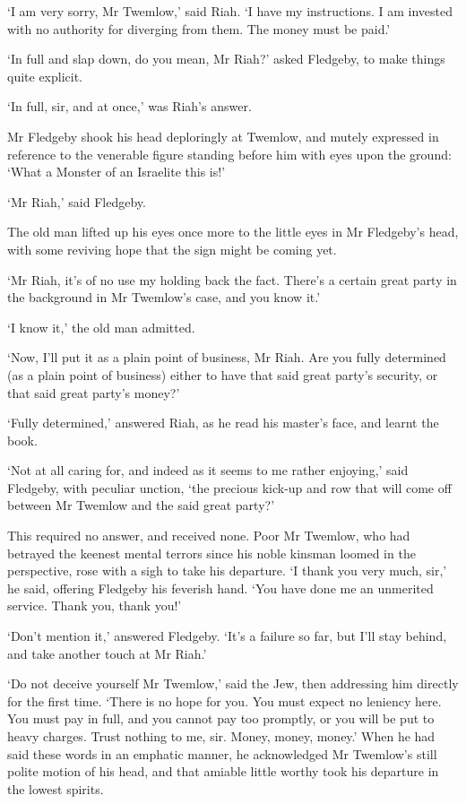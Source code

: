 ‘I am very sorry, Mr Twemlow,’ said Riah. ‘I have my instructions. I am
invested with no authority for diverging from them. The money must be
paid.’

‘In full and slap down, do you mean, Mr Riah?’ asked Fledgeby, to make
things quite explicit.

‘In full, sir, and at once,’ was Riah’s answer.

Mr Fledgeby shook his head deploringly at Twemlow, and mutely expressed
in reference to the venerable figure standing before him with eyes upon
the ground: ‘What a Monster of an Israelite this is!’

‘Mr Riah,’ said Fledgeby.

The old man lifted up his eyes once more to the little eyes in Mr
Fledgeby’s head, with some reviving hope that the sign might be coming
yet.

‘Mr Riah, it’s of no use my holding back the fact. There’s a certain
great party in the background in Mr Twemlow’s case, and you know it.’

‘I know it,’ the old man admitted.

‘Now, I’ll put it as a plain point of business, Mr Riah. Are you fully
determined (as a plain point of business) either to have that said great
party’s security, or that said great party’s money?’

‘Fully determined,’ answered Riah, as he read his master’s face, and
learnt the book.

‘Not at all caring for, and indeed as it seems to me rather enjoying,’
said Fledgeby, with peculiar unction, ‘the precious kick-up and row that
will come off between Mr Twemlow and the said great party?’

This required no answer, and received none. Poor Mr Twemlow, who had
betrayed the keenest mental terrors since his noble kinsman loomed in
the perspective, rose with a sigh to take his departure. ‘I thank you
very much, sir,’ he said, offering Fledgeby his feverish hand. ‘You have
done me an unmerited service. Thank you, thank you!’

‘Don’t mention it,’ answered Fledgeby. ‘It’s a failure so far, but I’ll
stay behind, and take another touch at Mr Riah.’

‘Do not deceive yourself Mr Twemlow,’ said the Jew, then addressing him
directly for the first time. ‘There is no hope for you. You must expect
no leniency here. You must pay in full, and you cannot pay too promptly,
or you will be put to heavy charges. Trust nothing to me, sir. Money,
money, money.’ When he had said these words in an emphatic manner, he
acknowledged Mr Twemlow’s still polite motion of his head, and that
amiable little worthy took his departure in the lowest spirits.

